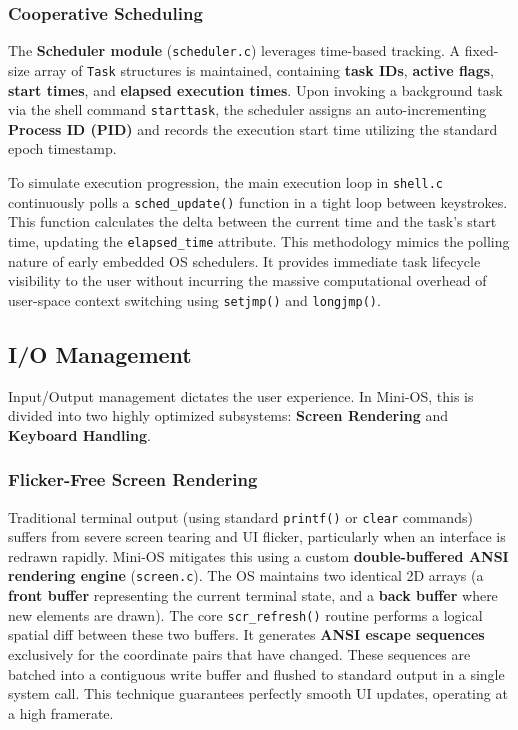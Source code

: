 \documentclass[conference]{IEEEtran}
\begin{document}
\subsubsection{\textbf{Cooperative Scheduling}}
The \textbf{Scheduler module} (\texttt{scheduler.c}) leverages time-based tracking. A fixed-size array of \texttt{Task} structures is maintained, containing \textbf{task IDs}, \textbf{active flags}, \textbf{start times}, and \textbf{elapsed execution times}. 
Upon invoking a background task via the shell command \texttt{starttask}, the scheduler assigns an auto-incrementing \textbf{Process ID (PID)} and records the execution start time utilizing the standard epoch timestamp. 

To simulate execution progression, the main execution loop in \texttt{shell.c} continuously polls a \texttt{sched\_update()} function in a tight loop between keystrokes. This function calculates the delta between the current time and the task's start time, updating the \texttt{elapsed\_time} attribute. This methodology mimics the polling nature of early embedded OS schedulers. It provides immediate task lifecycle visibility to the user without incurring the massive computational overhead of user-space context switching using \texttt{setjmp()} and \texttt{longjmp()}.

\subsection{I/O Management}
Input/Output management dictates the user experience. In Mini-OS, this is divided into two highly optimized subsystems: \textbf{Screen Rendering} and \textbf{Keyboard Handling}.

\subsubsection{\textbf{Flicker-Free Screen Rendering}}
Traditional terminal output (using standard \texttt{printf()} or \texttt{clear} commands) suffers from severe screen tearing and UI flicker, particularly when an interface is redrawn rapidly. Mini-OS mitigates this using a custom \textbf{double-buffered ANSI rendering engine} (\texttt{screen.c}). 
The OS maintains two identical 2D arrays (a \textbf{front buffer} representing the current terminal state, and a \textbf{back buffer} where new elements are drawn). The core \texttt{scr\_refresh()} routine performs a logical spatial diff between these two buffers. It generates \textbf{ANSI escape sequences} exclusively for the coordinate pairs that have changed. These sequences are batched into a contiguous write buffer and flushed to standard output in a single system call. This technique guarantees perfectly smooth UI updates, operating at a high framerate.
\end{document}

